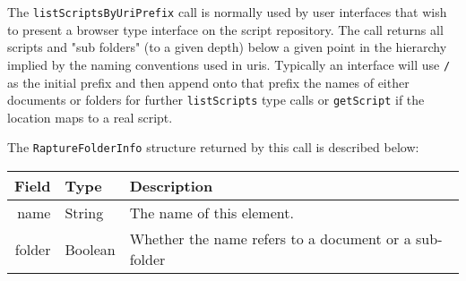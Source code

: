The \verb+listScriptsByUriPrefix+ call is normally used by user interfaces that wish
to present a browser type interface on the script repository. The call returns all scripts
and "sub folders" (to a given depth) below a given point in the hierarchy implied
by the naming conventions used in uris. Typically an interface will use \verb+/+ as
the initial prefix and then append onto that prefix the names of either documents
or folders for further \verb+listScripts+ type calls or \verb+getScript+ if the location
maps to a real script.

The \verb+RaptureFolderInfo+ structure returned by this call is described below:

\begin{table}[ht]
\begin{center}
\begin{tabular}{r l p{8cm}}
  Field & Type & Description \\
  \hline
  name & String & The name of this element. \\
  folder & Boolean & Whether the name refers to a document or a sub-folder \\
\end{tabular}
\end{center}
\end{table}
